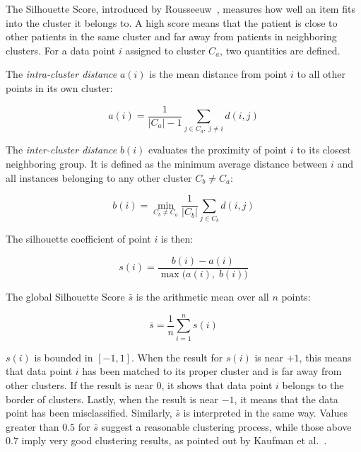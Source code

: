 The Silhouette Score, introduced by Rousseeuw~\cite{rousseeuw1987}, measures how well an item fits into the cluster it belongs to. A high score means that the patient is close to other patients in the same cluster and far away from patients in neighboring clusters. For a data point $i$ assigned to cluster $C_a$, two quantities are defined.

\vspace{1em}

The \emph{intra-cluster distance} $a(i)$ is the mean distance from point $i$ to all other points in its own cluster:

\begin{equation}
    a(i) = \frac{1}{|C_a| - 1} \sum_{j \in C_a,\; j \neq i} d(i, j)
    \label{eq:silhouette_a}
\end{equation}

\vspace {1em}

The \emph{inter-cluster distance} $b(i)$ evaluates the proximity of point $i$ to its closest neighboring group. It is defined as the minimum average distance between $i$ and all instances belonging to any other cluster $C_b \neq C_a$:

\begin{equation}
    b(i) = \min_{C_b \neq C_a} \frac{1}{|C_b|} \sum_{j \in C_b} d(i, j)
    \label{eq:silhouette_b}
\end{equation}

The silhouette coefficient of point $i$ is then:

\begin{equation}
    s(i) = \frac{b(i) - a(i)}{\max\bigl(a(i),\; b(i)\bigr)}
    \label{eq:silhouette_si}
\end{equation}

The global Silhouette Score $\bar{s}$ is the arithmetic mean over all $n$ points:

\begin{equation}
    \bar{s} = \frac{1}{n} \sum_{i=1}^{n} s(i)
    \label{eq:silhouette_global}
\end{equation}

$s(i)$ is bounded in $[-1, 1]$. When the result for $s(i)$ is near $+1$, this means that data point $i$ has been matched to its proper cluster and is far away from other clusters. If the result is near $0$, it shows that data point $i$ belongs to the border of clusters. Lastly, when the result is near $-1$, it means that the data point has been misclassified. Similarly, $\bar{s}$ is interpreted in the same way. Values greater than $0.5$ for $\bar{s}$ suggest a reasonable clustering process, while those above $0.7$ imply very good clustering results, as pointed out by Kaufman et al.~\cite{kaufman1990}.

